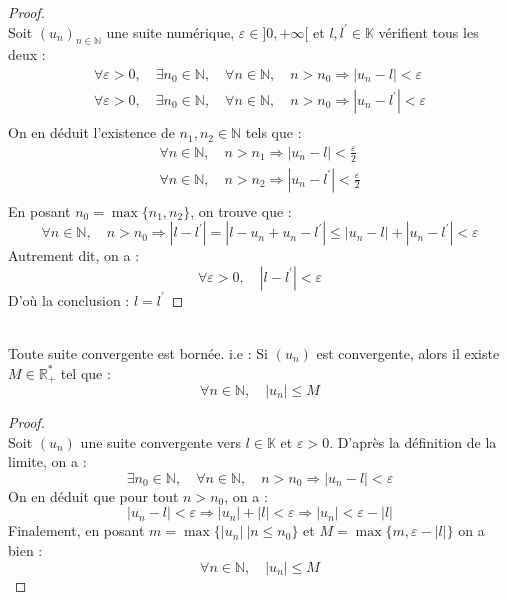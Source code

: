     \begin{proof}
        \ \\
        Soit \((u_n)_{n\in\mathbb{N}}\) une suite numérique, \(\varepsilon \in ]0, +\infty[ \) et \(l, l^{\prime} \in \mathbb{K}\) vérifient tous les deux :
        \[
            \begin{array}{l}
                \forall \varepsilon > 0, \quad \exists n_0 \in \mathbb{N}, \quad \forall n \in \mathbb{N}, \quad n > n_0 \Rightarrow |u_n - l| < \varepsilon\\
                \forall \varepsilon > 0, \quad \exists n_0 \in \mathbb{N}, \quad \forall n \in \mathbb{N}, \quad n > n_0 \Rightarrow |u_n - l^{\prime}| < \varepsilon\\
            \end{array}
        \]
        On en déduit l'existence de \(n_1, n_2 \in \mathbb{N}\) tels que :
        \[
            \begin{array}{l}
                \forall n \in \mathbb{N},\quad n > n_1 \Rightarrow |u_n - l| < \frac{\varepsilon}{2}\\
                \forall n \in \mathbb{N},\quad n > n_2 \Rightarrow |u_n - l^{\prime}| < \frac{\varepsilon}{2}\\
            \end{array}    
        \]
        En posant \(n_0 = \max{\{n_1, n_2\}}\), on trouve que :
        \[
            \forall n \in \mathbb{N},\quad n > n_0 \Rightarrow |l - l^{\prime}| = |l - u_n + u_n - l^{\prime}| \le |u_n - l| + |u_n - l^{\prime}| < \varepsilon
        \]
        Autrement dit, on a :
        \[
            \forall \varepsilon > 0, \quad |l - l^{\prime}| < \varepsilon 
        \]
        D'où la conclusion : \(l = l^{\prime}\)
    \end{proof}

    \begin{theorem}
        \ \\
        Toute suite convergente est bornée. i.e : Si \((u_n)\) est convergente, alors il existe \(M \in \mathbb{R}^{*}_{+}\) tel que :
        \[\forall n \in \mathbb{N}, \quad |u_n| \le M\]
    \end{theorem}

    \begin{proof}
        \ \\
        Soit \((u_n)\) une suite convergente vers \(l \in \mathbb{K}\) et \(\varepsilon > 0\). D'après la définition de la limite, on a :
        \[
            \exists n_0 \in \mathbb{N}, \quad \forall n \in \mathbb{N}, \quad n > n_0 \Rightarrow |u_n - l| < \varepsilon    
        \]
        On en déduit que pour tout \(n>n_0\), on a :
        \[
            |u_n - l| < \varepsilon \Rightarrow |u_n| + |l| < \varepsilon \Rightarrow |u_n| < \varepsilon - |l|    
        \]
        Finalement, en posant \(m = \max{\{|u_n|\ | n \le n_0\}}\) et \(M = \max{\{m, \varepsilon - |l|\}}\) on a bien :
        \[\forall n \in \mathbb{N}, \quad |u_n| \le M\]
    \end{proof}

